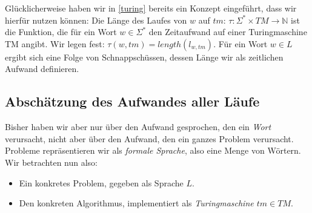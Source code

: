 Glücklicherweise haben wir in \autoref{turing} bereits ein Konzept eingeführt,
dass wir hierfür nutzen können:
Die Länge des Laufes von $w$ auf $tm$:
$\tau: \Sigma^* \times TM \rightarrow \mathbb{N}$ ist die Funktion,
die für ein Wort $w \in \Sigma^*$ den Zeitaufwand auf einer Turingmaschine TM angibt.
Wir legen fest: $\tau(w,tm) =  length(l_{w,tm})$.
Für ein Wort $w \in L$ ergibt sich eine Folge von Schnappschüssen,
dessen Länge wir als zeitlichen Aufwand definieren.



\subsection{Abschätzung des Aufwandes aller Läufe}

Bisher haben wir aber nur über den Aufwand gesprochen,
den ein \emph{Wort} verursacht,
nicht aber über den Aufwand,
den ein ganzes Problem verursacht.
Probleme repräsentieren wir als \emph{formale Sprache},
also eine Menge von Wörtern.
Wir betrachten nun also:
\begin{itemize}
    \item Ein konkretes Problem, gegeben als Sprache $L$.
    \item Den konkreten Algorithmus,
        implementiert als \emph{Turingmaschine $tm \in TM$}.
\end{itemize}

